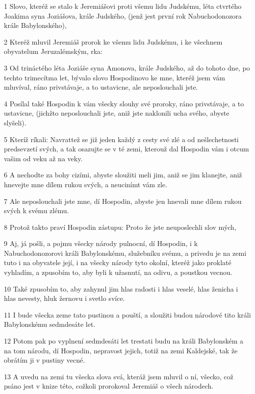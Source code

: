 \par 1 Slovo, kteréž se stalo k Jeremiášovi proti všemu lidu Judskému, léta ctvrtého Joakima syna Joziášova, krále Judského, (jenž jest první rok Nabuchodonozora krále Babylonského),
\par 2 Kteréž mluvil Jeremiáš prorok ke všemu lidu Judskému, i ke všechnem obyvatelum Jeruzalémským, rka:
\par 3 Od trináctého léta Joziáše syna Amonova, krále Judského, až do tohoto dne, po techto trimecítma let, bývalo slovo Hospodinovo ke mne, kteréž jsem vám mluvíval, ráno privstávaje, a to ustavicne, ale neposlouchali jste.
\par 4 Posílal také Hospodin k vám všecky slouhy své proroky, ráno privstávaje, a to ustavicne, (jichžto neposlouchali jste, aniž jste naklonili ucha svého, abyste slyšeli).
\par 5 Kteríž ríkali: Navrattež se již jeden každý z cesty své zlé a od nešlechetnosti predsevzetí svých, a tak osazujte se v té zemi, kterouž dal Hospodin vám i otcum vašim od veku až na veky.
\par 6 A nechodte za bohy cizími, abyste sloužiti meli jim, aniž se jim klanejte, aniž hnevejte mne dílem rukou svých, a neucinímt vám zle.
\par 7 Ale neposlouchali jste mne, dí Hospodin, abyste jen hnevali mne dílem rukou svých k svému zlému.
\par 8 Protož takto praví Hospodin zástupu: Proto že jste neuposlechli slov mých,
\par 9 Aj, já pošli, a pojmu všecky národy pulnocní, dí Hospodin, i k Nabuchodonozorovi králi Babylonskému, služebníku svému, a privedu je na zemi tuto i na obyvatele její, i na všecky národy tyto okolní, kteréž jako proklaté vyhladím, a zpusobím to, aby byli k užasnutí, na odivu, a poustkou vecnou.
\par 10 Také zpusobím to, aby zahynul jim hlas radosti i hlas veselé, hlas ženicha i hlas nevesty, hluk žernovu i svetlo svíce.
\par 11 I bude všecka zeme tato pustinou a pouští, a sloužiti budou národové tito králi Babylonskému sedmdesáte let.
\par 12 Potom pak po vyplnení sedmdesáti let trestati budu na králi Babylonském a na tom národu, dí Hospodin, nepravost jejich, totiž na zemi Kaldejské, tak že obrátím ji v pustiny vecné.
\par 13 A uvedu na zemi tu všecka slova svá, kteráž jsem mluvil o ní, všecko, což psáno jest v knize této, cožkoli prorokoval Jeremiáš o všech národech.
